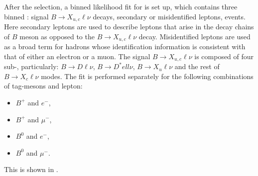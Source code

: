 After the selection, a binned likelihood fit for \Mbc is set up, which contains three binned : signal $B\rightarrow X_{u,c}\ell\nu$ decays, 
secondary or misidentified leptons, \epem\ra\qqbar events. Here secondary leptons are used to describe leptons that arise in the decay chains of $B$ meson as opposed to the $B\rightarrow X_{u,c}\ell\nu$ decay.
Misidentified leptons are used as a broad term for hadrons whose identification information is consistent with that of either an electron or a muon.
The signal $B\rightarrow X_{u,c}\ell\nu$ \PDF is composed of four sub-, particularly: $B\rightarrow D\ell\nu$, $B\rightarrow D^*ell\nu$, $B\rightarrow X_u\ell\nu$ and the rest of  $B\rightarrow X_c\ell\nu$ modes.
The fit is performed separately for the following combinations of tag-\B mesons and lepton:
\begin{itemize}
    \item $B^+$ and $e^-$,
    \item $B^+$ and $\mu^-$,
    \item $B^0$ and $e^-$,
    \item $B^0$ and $\mu^-$.
\end{itemize}
This is shown in .
